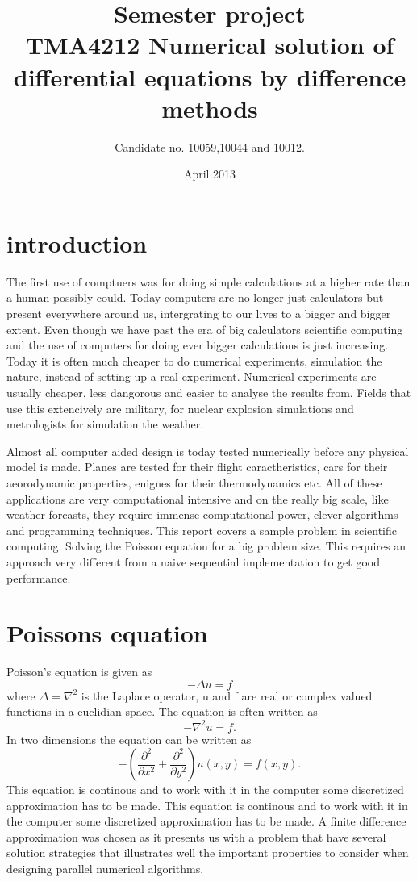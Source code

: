\documentclass{article}
\title{Semester project \\ TMA4212 Numerical solution of differential equations by difference methods }
\author{Candidate no. 10059,10044 and 10012.}
\date{April 2013}
\begin{document}
\maketitle

\section{introduction}
The first use of comptuers was for doing simple calculations at a higher rate
than a human possibly could. Today computers are no longer just calculators but
present everywhere around us, intergrating to our lives to a bigger and bigger extent.
Even though we have past the era of big calculators scientific computing and the use
of computers for doing ever bigger calculations is just increasing. Today it is
often much cheaper to do numerical experiments, simulation the nature, instead of
setting up a real experiment. Numerical experiments are usually cheaper, less
dangorous and easier to analyse the results from. Fields that use this extencively
are military, for nuclear explosion simulations and metrologists for simulation the weather.

Almost all computer aided design is today tested numerically before any physical model is made.
Planes are tested for their flight caractheristics, cars for their aeorodynamic properties, enignes
for their thermodynamics etc. All of these applications are very computational intensive and on the
really big scale, like weather forcasts, they require immense computational power, clever algorithms
and programming techniques. This report covers a sample problem in scientific computing. Solving the
Poisson equation for a big problem size. This requires an approach very different from a naive
sequential implementation to get good performance.

\section{Poissons equation}
Poisson's equation is given as
\[
-\Delta u = f
\]
where $\Delta = \nabla^2$ is the Laplace operator, u and f are real or complex valued functions in a
euclidian space. The equation is often written as
\[
-\nabla^2 u = f.
\]
In two dimensions the equation can be written as
\[
-\left( \frac{\partial^2}{\partial x^2} + \frac{\partial^2}{\partial y^2} \right) u(x,y) = f(x,y).
\]
This equation is continous and to work with it in the computer some discretized approximation has
to be made. This equation is continous and to work with it in the computer some discretized approximation has to be made. A finite difference approximation was chosen as it presents us with a
problem that have several solution strategies that illustrates well the important properties to
consider when designing parallel numerical algorithms.
\end{document}
